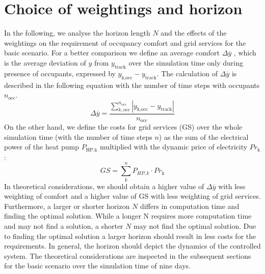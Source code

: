 \section{Choice of weightings and horizon}
\label{Choise of weigtings and horizon}
In the following, we analyse the horizon length $N$  and the effects of the weightings on the requirement of occupancy comfort and grid services for the basic scenario. For a better comparison we define an average comfort $\Delta \overline{y}$ , which is the average deviation of $y$ from $y_\text{track}$ over the simulation time only during presence of occupants, expressed by $y_\text{k,occ} - y_\text{track}$. The calculation of $\Delta \overline{y}$ is described in the following equation with the number of time steps with occupants $n_\text{occ}$.
\begin{equation}
    \label{eq:average comfort}
    \Delta \overline{y} = \frac{\sum_{k,occ}^{n_\text{occ}} |y_\text{k,occ} - y_\text{track}|}{n_\text{occ}}
\end{equation}
On the other hand, we define the costs for grid services (GS)  over the whole simulation time (with the number of time steps $n$) as the sum of the electrical power of the heat pump $P_\text{HP,k}$ multiplied with the dynamic price of electricity $Pr_\text{k}$:
\begin{equation}
\label{eq:GridService123}
    GS = \sum_{k}^n P_{HP,k}\cdot Pr_\text{k}
\end{equation}
In theoretical considerations, we should obtain a higher value of $\Delta \overline{y}$ with less weighting of comfort and a higher value of GS with less weighting of grid services. Furthermore, a larger or shorter horizon $N$ differs in computation time and finding the optimal solution. While a longer N requires more computation time and may not find a solution, a shorter $N$ may not find the optimal solution. Due to finding the optimal solution a larger horizon should result in less costs for the requirements. In general, the horizon should depict the dynamics of the controlled system. \newline
The theoretical considerations are inspected in the subsequent sections for the basic scenario over the simulation time of nine days.   

